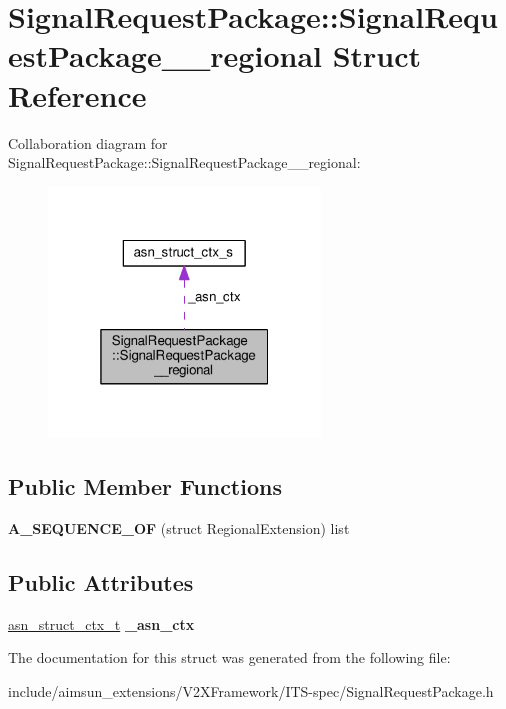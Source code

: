 \hypertarget{structSignalRequestPackage_1_1SignalRequestPackage____regional}{}\section{Signal\+Request\+Package\+:\+:Signal\+Request\+Package\+\_\+\+\_\+regional Struct Reference}
\label{structSignalRequestPackage_1_1SignalRequestPackage____regional}


Collaboration diagram for Signal\+Request\+Package\+:\+:Signal\+Request\+Package\+\_\+\+\_\+regional\+:\nopagebreak
\begin{figure}[H]
\begin{center}
\leavevmode
\includegraphics[width=205pt]{structSignalRequestPackage_1_1SignalRequestPackage____regional__coll__graph}
\end{center}
\end{figure}
\subsection*{Public Member Functions}
\begin{DoxyCompactItemize}
\item 
{\bfseries A\+\_\+\+S\+E\+Q\+U\+E\+N\+C\+E\+\_\+\+OF} (struct Regional\+Extension) list\hypertarget{structSignalRequestPackage_1_1SignalRequestPackage____regional_a609386a71763dc142c1ac5a5f4c09df4}{}\label{structSignalRequestPackage_1_1SignalRequestPackage____regional_a609386a71763dc142c1ac5a5f4c09df4}

\end{DoxyCompactItemize}
\subsection*{Public Attributes}
\begin{DoxyCompactItemize}
\item 
\hyperlink{structasn__struct__ctx__s}{asn\+\_\+struct\+\_\+ctx\+\_\+t} {\bfseries \+\_\+asn\+\_\+ctx}\hypertarget{structSignalRequestPackage_1_1SignalRequestPackage____regional_aff69c3835766fe1dad95132f4a420b76}{}\label{structSignalRequestPackage_1_1SignalRequestPackage____regional_aff69c3835766fe1dad95132f4a420b76}

\end{DoxyCompactItemize}


The documentation for this struct was generated from the following file\+:\begin{DoxyCompactItemize}
\item 
include/aimsun\+\_\+extensions/\+V2\+X\+Framework/\+I\+T\+S-\/spec/Signal\+Request\+Package.\+h\end{DoxyCompactItemize}
